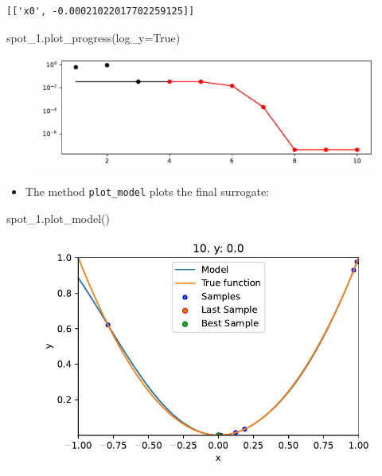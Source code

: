 \documentclass[
  letterpaper,
  DIV=11,
  numbers=noendperiod]{scrreprt}
\newenvironment{Shaded}{\begin{snugshade}}{\end{snugshade}}
\newcommand{\NormalTok}[1]{\textcolor[rgb]{0.00,0.23,0.31}{#1}}
\newcommand{\OperatorTok}[1]{\textcolor[rgb]{0.37,0.37,0.37}{#1}}
\newcommand{\VariableTok}[1]{\textcolor[rgb]{0.07,0.07,0.07}{#1}}
\providecommand{\tightlist}{%
  \setlength{\itemsep}{0pt}\setlength{\parskip}{0pt}}\usepackage{longtable,booktabs,array}
\begin{document}
\begin{verbatim}
[['x0', -0.00021022017702259125]]
\end{verbatim}

\begin{Shaded}
\begin{Highlighting}[]
\NormalTok{spot\_1.plot\_progress(log\_y}\OperatorTok{=}\VariableTok{True}\NormalTok{)}
\end{Highlighting}
\end{Shaded}

\begin{figure}[H]

{\centering \includegraphics{04_spot_sklearn_surrogate_files/figure-pdf/cell-23-output-1.pdf}

}

\end{figure}

\begin{itemize}
\tightlist
\item
  The method \texttt{plot\_model} plots the final surrogate:
\end{itemize}

\begin{Shaded}
\begin{Highlighting}[]
\NormalTok{spot\_1.plot\_model()}
\end{Highlighting}
\end{Shaded}

\begin{figure}[H]

{\centering \includegraphics{04_spot_sklearn_surrogate_files/figure-pdf/cell-24-output-1.pdf}

}

\end{figure}
\end{document}
